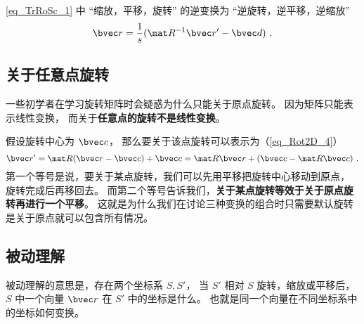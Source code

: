 \autoref{eq_TrRoSc_1} 中 “缩放，平移，旋转” 的逆变换为 “逆旋转，逆平移，逆缩放”
\begin{equation}
\bvec r= \frac1s (\mat R^{-1}\bvec r' - \bvec d)~.
\end{equation}

\subsection{关于任意点旋转}
一些初学者在学习旋转矩阵时会疑惑为什么只能关于原点旋转。 因为矩阵只能表示线性变换， 而关于\textbf{任意点的旋转不是线性变换}。

假设旋转中心为 $\bvec c$， 那么要关于该点旋转可以表示为（\autoref{eq_Rot2D_4}）
\begin{equation}
\bvec r' = \mat R(\bvec r-\bvec c) + \bvec c = \mat R\bvec r + (\bvec c-\mat R\bvec c)~.
\end{equation}
第一个等号是说，要关于某点旋转，我们可以先用平移把旋转中心移动到原点， 旋转完成后再移回去。 而第二个等号告诉我们，\textbf{关于某点旋转等效于关于原点旋转再进行一个平移}。 这就是为什么我们在讨论三种变换的组合时只需要默认旋转是关于原点就可以包含所有情况。

\subsection{被动理解}
被动理解的意思是，存在两个坐标系 $S,S'$， 当 $S'$ 相对 $S$ 旋转，缩放或平移后， $S$ 中一个向量 $\bvec r$ 在 $S'$ 中的坐标是什么。 也就是同一个向量在不同坐标系中的坐标如何变换。

